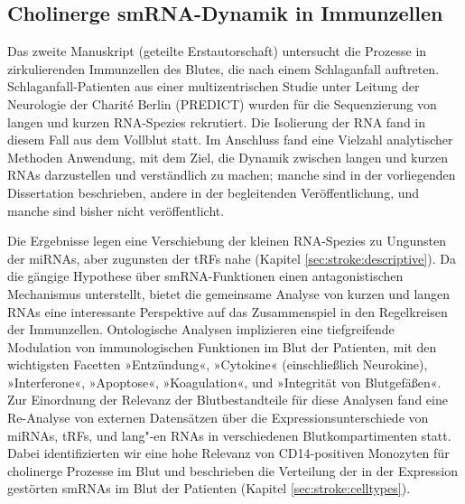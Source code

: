 \subsection{Cholinerge smRNA-Dynamik in Immunzellen}
Das zweite Manuskript (geteilte Erstautorschaft) untersucht die Prozesse in zirkulierenden Immunzellen des Blutes, die nach einem Schlaganfall auftreten.\cite{Winek2020} Schlaganfall-Patienten aus einer multizentrischen Studie unter Leitung der Neurologie der Charité Berlin (PREDICT) wurden für die Sequenzierung von langen und kurzen RNA-Spezies rekrutiert. Die Isolierung der RNA fand in diesem Fall aus dem Vollblut statt. Im Anschluss fand eine Vielzahl analytischer Methoden Anwendung, mit dem Ziel, die Dynamik zwischen langen und kurzen RNAs darzustellen und verständlich zu machen; manche sind in der vorliegenden Dissertation beschrieben, andere in der begleitenden Veröffentlichung, und manche sind bisher nicht veröffentlicht.

Die Ergebnisse legen eine Verschiebung der kleinen RNA-Spezies zu Ungunsten der miRNAs, aber zugunsten der tRFs nahe (Kapitel \ref{sec:stroke:descriptive}). Da die gängige Hypothese über smRNA-Funktionen einen antagonistischen Mechanismus unterstellt, bietet die gemeinsame Analyse von kurzen und langen RNAs eine interessante Perspektive auf das Zusammenspiel in den Regelkreisen der Immunzellen. Ontologische Analysen implizieren eine tiefgreifende Modulation von immunologischen Funktionen im Blut der Patienten, mit den wichtigsten Facetten »Entzündung«, »Cytokine« (einschließlich Neurokine), »Interferone«, »Apoptose«, »Koagulation«, und »Integrität von Blutgefäßen«. Zur Einordnung der Relevanz der Blutbestandteile für diese Analysen fand eine Re-Analyse von externen Datensätzen über die Expressionsunterschiede von miRNAs, tRFs, und lang"-en RNAs in verschiedenen Blutkompartimenten statt. Dabei identifizierten wir eine hohe Relevanz von CD14-positiven Monozyten für cholinerge Prozesse im Blut und beschrieben die Verteilung der in der Expression gestörten smRNAs im Blut der Patienten (Kapitel \ref{sec:stroke:celltypes}).

